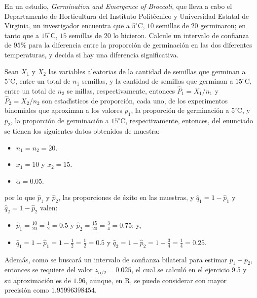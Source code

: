 \begin{enunciado}
 En un estudio, \textit{Germination and Emergence of Broccoli}, que lleva a cabo el Departamento de Horticultura del Instituto Polit\'ecnico y Universidad Estatal de Virginia, un investigador encuentra que a $5^{\circ}$C, $10$ semillas de $20$ germinaron; en tanto que a $15^{\circ}$C, $15$ semillas de $20$ lo hicieron. Calcule un intervalo de confianza de $95\%$ para la diferencia entre la proporci\'on de germinaci\'on en las dos diferentes temperaturas, y decida si hay una diferencia significativa.
\end{enunciado}

\begin{solucion}
 Sean $X_1$ y $X_2$ las variables aleatorias de la cantidad de semillas que germinan a $5^{\circ}$C, entre un total de $n_1$ semillas, y la cantidad de semillas que germinan a $15^{\circ}$C, entre un total de $n_2$ se millas, respectivamente, entonces $\widehat{P}_1 = X_1/n_1$ y $\widehat{P}_2 = X_2/n_2$ son estad\'{\i}sticos de proporci\'on, cada uno, de los experimentos binomiales que aproximan a los valores $p_1$, la proporci\'on de germinaci\'on a $5^{\circ}$C, y $p_2$, la proporci\'on de germinaci\'on a $15^{\circ}$C, respectivamente, entonces, del enunciado se tienen los siguientes datos obtenidos de muestra:
 \begin{itemize}
  \item $n_1 = n_2 = 20$.
  \item $x_1 = 10$ y $x_2 = 15$.
  \item $\alpha = 0.05$.
 \end{itemize}
 por lo que $\hat{p}_1$ y $\hat{p}_2$, las proporciones de \'exito en las muestras, y $\hat{q}_1 = 1 - \hat{p}_1$ y $\hat{q}_2 = 1 - \hat{p}_2$ valen:
 \begin{itemize}
  \item $\hat{p}_1 = \frac{10}{20} = \frac{1}{2} = 0.5$ y $\hat{p}_2 = \frac{15}{20} = \frac{3}{4} = 0.75$; y,
  \item $\hat{q}_1 = 1 - \hat{p}_1 = 1 - \frac{1}{2} = \frac{1}{2} = 0.5$ y $\hat{q}_2 = 1 - \hat{p}_2 = 1 - \frac{3}{4} = \frac{1}{4} = 0.25$.
 \end{itemize}
 Adem\'as, como se buscar\'a un intervalo de confianza bilateral para estimar $p_1 - p_2$, entonces se requiere del valor $z_{\alpha/2} = 0.025$, el cual se calcul\'o en el ejercicio 9.5 y su aproximaci\'on es de $1.96$, aunque, en R, se puede considerar con mayor precisi\'on como $1.95996398454$.
 \par 

\end{solucion}
